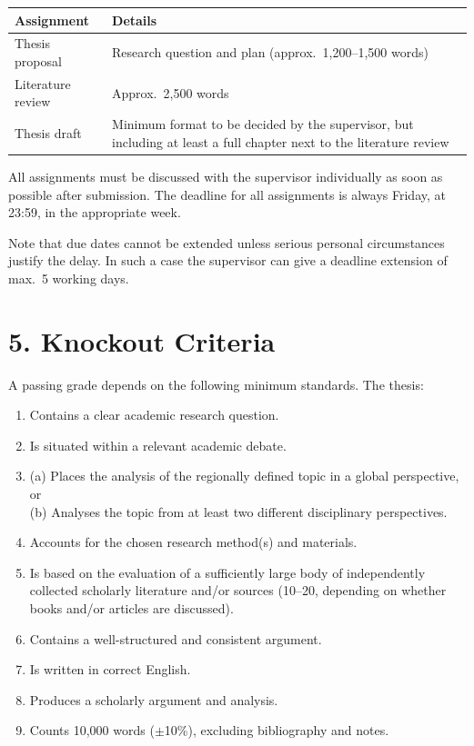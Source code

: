 \documentclass[11pt,a4paper]{article}
\begin{document}
\begin{center}
\begin{tabularx}{\textwidth}{lX}
\toprule
\textbf{Assignment} & \textbf{Details} \\
\midrule
Thesis proposal & Research question and plan (approx.\ 1,200--1,500 words) \\
Literature review & Approx.\ 2,500 words \\
Thesis draft & Minimum format to be decided by the supervisor, but including at least a full chapter next to the literature review \\
\bottomrule
\end{tabularx}
\end{center}

All assignments must be discussed with the supervisor individually as soon as possible after submission. The deadline for all assignments is always Friday, at 23:59, in the appropriate week.

Note that due dates cannot be extended unless serious personal circumstances justify the delay. In such a case the supervisor can give a deadline extension of max.\ 5 working days.

\section{5. Knockout Criteria}

A passing grade depends on the following minimum standards. The thesis:

\begin{enumerate}
    \item Contains a clear academic research question.
    \item Is situated within a relevant academic debate.
    \item (a) Places the analysis of the regionally defined topic in a global perspective, or\\
          (b) Analyses the topic from at least two different disciplinary perspectives.
    \item Accounts for the chosen research method(s) and materials.
    \item Is based on the evaluation of a sufficiently large body of independently collected scholarly literature and/or sources (10--20, depending on whether books and/or articles are discussed).
    \item Contains a well-structured and consistent argument.
    \item Is written in correct English.
    \item Produces a scholarly argument and analysis.
    \item Counts 10,000 words ($\pm$10\%), excluding bibliography and notes.
\end{enumerate}
\end{document}
